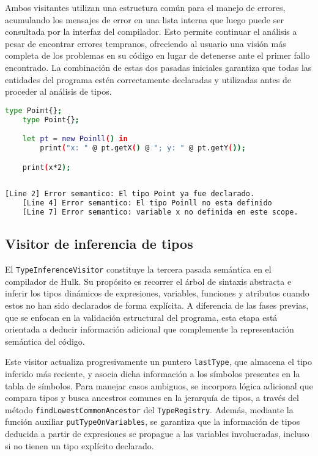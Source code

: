 \documentclass{llncs}
\begin{document}
	Ambos visitantes utilizan una estructura común para el manejo de errores, acumulando los mensajes de error en una lista interna que luego puede ser consultada por la interfaz del compilador. Esto permite continuar el análisis a pesar de encontrar errores tempranos, ofreciendo al usuario una visión más completa de los problemas en su código en lugar de detenerse ante el primer fallo encontrado. La combinación de estas dos pasadas iniciales garantiza que todas las entidades del programa estén correctamente declaradas y utilizadas antes de proceder al análisis de tipos.

	\begin{lstlisting}[language=bash, caption={Ejemplo de codigo con errores}]
	type Point{};
	type Point{};

	let pt = new Poinll() in
		print("x: " @ pt.getX() @ "; y: " @ pt.getY());

	print(x*2);
	
	\end{lstlisting}

	\begin{lstlisting}[language=bash, caption={Múltiples errores capturados}]
	[Line 2] Error semantico: El tipo Point ya fue declarado.
	[Line 4] Error semantico: El tipo Poinll no esta definido
	[Line 7] Error semantico: variable x no definida en este scope.
	\end{lstlisting}

	\subsection{Visitor de inferencia de tipos}

	El \texttt{TypeInferenceVisitor} constituye la tercera pasada semántica en el compilador de Hulk. Su propósito es recorrer el árbol de sintaxis abstracta e inferir los tipos dinámicos de expresiones, variables, funciones y atributos cuando estos no han sido declarados de forma explícita. A diferencia de las fases previas, que se enfocan en la validación estructural del programa, esta etapa está orientada a deducir información adicional que complemente la representación semántica del código. 

	Este visitor actualiza progresivamente un puntero \texttt{lastType}, que almacena el tipo inferido más reciente, y asocia dicha información a los símbolos presentes en la tabla de símbolos. Para manejar casos ambiguos, se incorpora lógica adicional que compara tipos y busca ancestros comunes en la jerarquía de tipos, a través del método \texttt{findLowestCommonAncestor} del \texttt{TypeRegistry}. Además, mediante la función auxiliar \texttt{putTypeOnVariables}, se garantiza que la información de tipos deducida a partir de expresiones se propague a las variables involucradas, incluso si no tienen un tipo explícito declarado.
\end{document}
